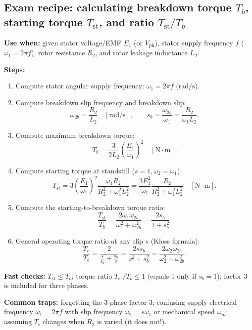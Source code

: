 \subsection{Exam recipe: calculating breakdown torque \texorpdfstring{$T_b$}{T_b}, starting torque \texorpdfstring{$T_{\mathrm{st}}$}{T_st}, and ratio \texorpdfstring{$T_{\mathrm{st}}/T_b$}{T_st/T_b}}
\textbf{Use when:} given stator voltage/EMF \(E_1\) (or \(V_{\mathrm{ph}}\)), stator supply frequency \(f\) (\(\omega_1 = 2\pi f\)), rotor resistance \(R_2\), and rotor leakage inductance \(L_2\).

\textbf{Steps:}
\begin{enumerate}
  \item Compute stator angular supply frequency: \(\omega_1 = 2\pi f\) (\(\mathrm{rad/s}\)).
  \item Compute breakdown slip frequency and breakdown slip:
  \[
  \omega_{2b} = \frac{R_2}{L_2} \quad [\mathrm{rad/s}],
  \qquad
  s_b = \frac{\omega_{2b}}{\omega_1} = \frac{R_2}{\omega_1 L_2}.
  \]
  \item Compute maximum breakdown torque:
  \[
  T_b = \frac{3}{2 L_2}\left(\frac{E_1}{\omega_1}\right)^2 \quad [\mathrm{N\cdot m}].
  \]
  \item Compute starting torque at standstill (\(s=1, \omega_2=\omega_1\)):
  \[
  T_{\mathrm{st}} = 3\left(\frac{E_1}{\omega_1}\right)^2\frac{\omega_1 R_2}{R_2^2 + \omega_1^2 L_2^2}
  = \frac{3 E_1^2}{\omega_1}\frac{R_2}{R_2^2 + \omega_1^2 L_2^2} \quad [\mathrm{N\cdot m}].
  \]
  \item Compute the starting-to-breakdown torque ratio:
  \[
  \frac{T_{\mathrm{st}}}{T_b} = \frac{2 \omega_1 \omega_{2b}}{\omega_1^2 + \omega_{2b}^2} = \frac{2 s_b}{1 + s_b^2}.
  \]
  \item General operating torque ratio at any slip \(s\) (Kloss formula):
  \[
  \frac{T_e}{T_b} = \frac{2}{\frac{s}{s_b} + \frac{s_b}{s}} = \frac{2 s s_b}{s^2 + s_b^2} = \frac{2 \omega_2 \omega_{2b}}{\omega_2^2 + \omega_{2b}^2}.
  \]
\end{enumerate}

\textbf{Fast checks:} \(T_{\mathrm{st}} \le T_b\); torque ratio \(T_{\mathrm{st}}/T_b \le 1\) (equals 1 only if \(s_b=1\)); factor 3 is included for three phases.

\textbf{Common traps:} forgetting the 3-phase factor 3; confusing supply electrical frequency \(\omega_1 = 2\pi f\) with slip frequency \(\omega_2 = s \omega_1\) or mechanical speed \(\omega_m\); assuming \(T_b\) changes when \(R_2\) is varied (it does not!).
